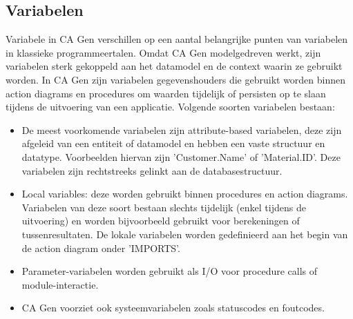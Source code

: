 \subsection{Variabelen}
Variabele in CA Gen verschillen op een aantal belangrijke punten van variabelen in klassieke programmeertalen. Omdat CA Gen modelgedreven werkt, zijn variabelen sterk gekoppeld aan het datamodel en de context waarin ze gebruikt worden. In CA Gen zijn variabelen gegevenshouders die gebruikt worden binnen action diagrams en procedures om waarden tijdelijk of persisten op te slaan tijdens de uitvoering van een applicatie. Volgende soorten variabelen bestaan:
\begin{itemize}
    \item De meest voorkomende variabelen zijn attribute-based variabelen, deze zijn afgeleid van een entiteit of datamodel en hebben een vaste structuur en datatype. Voorbeelden hiervan zijn 'Customer.Name' of 'Material.ID'. Deze variabelen zijn rechtstreeks gelinkt aan de databasestructuur.
    \item Local variables: deze worden gebruikt binnen procedures en action diagrams. Variabelen van deze soort bestaan slechts tijdelijk (enkel tijdens de uitvoering) en worden bijvoorbeeld gebruikt voor berekeningen of tussenresultaten. De lokale variabelen worden gedefinieerd aan het begin van de action diagram onder 'IMPORTS'.
    \item Parameter-variabelen worden gebruikt als I/O voor procedure calls of module-interactie.
    \item CA Gen voorziet ook systeemvariabelen zoals statuscodes en foutcodes.
\end{itemize}

